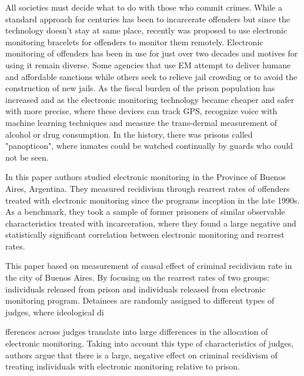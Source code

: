 \documentclass[a4paper,12pt]{article}
\begin{document}
All societies must decide what to do with those who commit crimes. While a standard approach for centuries has been to incarcerate offenders but since the technology doesn't stay at same place, recently was proposed to use electronic monitoring bracelets for offenders to monitor them remotely. Electronic monitoring of offenders has been in use for just over two decades and motives for using it remain diverse. Some agencies that use EM attempt to deliver humane and affordable sanctions while others seek to relieve jail crowding or to avoid the construction of new jails. 
As the fiscal burden of the prison population has increased and as the electronic monitoring technology became cheaper and safer with more precise, where these devices can track GPS, recognize voice with machine learning techniques and measure the trans-dermal measurement of alcohol or drug consumption. In the history, there was prisons called "panopticon", where inmates could be watched continually by guards who could not be seen.  

In this paper authors studied electronic monitoring in the Province of Buenos Aires, Argentina. They measured recidivism through rearrest rates of offenders treated with electronic monitoring since the programs inception in the late 1990s. As a benchmark, they took a sample of former prisoners of similar observable characteristics treated with incarceration, where they found a large negative and statistically significant correlation between electronic monitoring and rearrest rates.   

This paper based on measurement of causal effect of criminal recidivism rate in the city of Buenos Aires. By focusing on the rearrest rates of two groups: individuals released from prison and individuals released from electronic monitoring program. Detainees are randomly assigned to different types of judges, where ideological di

fferences across judges translate into large differences in the allocation of electronic monitoring. Taking into account this type of characteristics of judges, authors argue that there is a large, negative effect on criminal recidivism of treating individuals with electronic monitoring relative to prison. 
\end{document}
